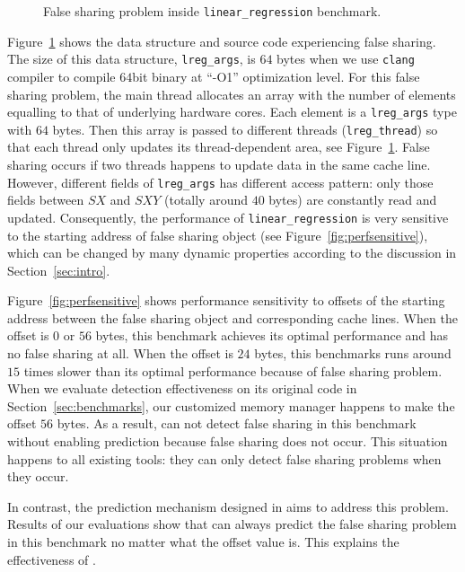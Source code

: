 \begin{figure}[!h]
{\centering
\subfigure{}
\caption{False sharing problem inside \texttt{linear\_regression} benchmark.
\label{fig:linearregression}}
}
\end{figure}

Figure~\ref{fig:linearregression} shows the data structure and source code
experiencing false sharing.
The size of this data structure, \texttt{lreg\_args}, is $64$ bytes 
when we use \texttt{clang} compiler to compile $64$bit binary at ``-O1'' optimization level.
For this false sharing problem, the main thread allocates an array with the number of elements equalling
to that of underlying hardware cores.
Each element is a \texttt{lreg\_args} type with $64$ bytes. 
Then this array is passed to different threads (\texttt{lreg\_thread}) 
so that each thread only updates its thread-dependent area, see Figure~\ref{fig:linearregression}.
False sharing occurs if two threads happens to update data in the same cache line. 
However, different fields of \texttt{lreg\_args} has different access pattern:
only those fields between $SX$ and $SXY$ (totally around $40$ bytes) are constantly read and updated.
Consequently, the performance of \texttt{linear\_regression} is very sensitive to 
the starting address of false sharing object (see Figure~\ref{fig:perfsensitive}),
which can be changed by many dynamic properties according
to the discussion in Section~\ref{sec:intro}.

Figure~\ref{fig:perfsensitive} shows performance sensitivity to 
offsets of the starting address between the false sharing object and corresponding cache lines. 
When the offset is $0$ or $56$ bytes, this benchmark achieves its optimal performance 
and has no false sharing at all.
When the offset is $24$ bytes, this benchmarks runs around $15$ times slower 
than its optimal performance because of false sharing problem.
When we evaluate detection effectiveness on its original code in Section~\ref{sec:benchmarks}, 
our customized memory manager happens to make the offset $56$ bytes. 
As a result, \Predator{} can not detect false sharing in this benchmark 
without enabling prediction because false sharing does not occur.
This situation happens to all existing tools: they can only detect false sharing problems when
they occur. 

In contrast, the prediction mechanism designed in \predator{} 
aims to address this problem. Results of our evaluations show 
that \Predator{} can always predict the false sharing problem in this
benchmark no matter what the offset value is. 
This explains the effectiveness of \Predator{}.


